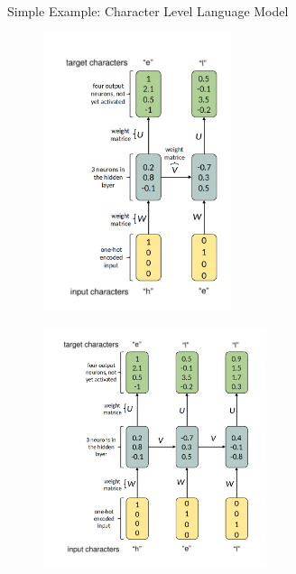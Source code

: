\begin{vbframe}{Simple Example: Character Level Language Model}
   \begin{minipage}{0.55\textwidth}
     \begin{figure}
         \includegraphics[width=5.5cm]{plots/nlp1b.png}%
         \end{figure}
    \end{minipage}%
    
   \begin{minipage}{0.55\textwidth}         
    \begin{figure}     
         \includegraphics[width=6.5cm]{plots/nlp1c.png}%
       \end{figure}
    \end{minipage}%
 \end{vbframe}
%  
%  

